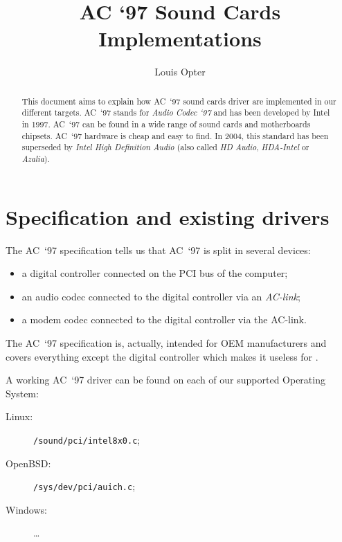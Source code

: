 \documentclass[a4paper,american]{rtxarticle}
\author{Louis Opter}
\title{AC `97 Sound Cards Implementations}
\begin{document}
\maketitle

\begin{abstract}
This document aims to explain how AC~`97 sound cards driver are implemented in
our different targets. AC~`97 stands for \emph{Audio Codec `97} and has been
developed by Intel in 1997. AC~`97 can be found in a wide range of sound cards
and motherboards chipsets. AC~`97 hardware is cheap and easy to find. In 2004,
this standard has been superseded by \emph{Intel High Definition Audio} (also
called \emph{HD Audio}, \emph{HDA-Intel} or \emph{Azalia}).
\end{abstract}

\section{Specification and existing drivers}

The AC~`97 specification tells us\cite[p. 11]{AC97spec} that AC~`97 is split in
several devices:
\begin{itemize}
\item a digital controller connected on the PCI bus of the computer;
\item an audio codec connected to the digital controller via an \emph{AC-link};
\item a modem codec connected to the digital controller via the AC-link.
\end{itemize}
The AC~`97 specification is, actually, intended for OEM manufacturers and covers
everything except the digital controller which makes it useless for \rtx.

A working AC~`97 driver can be found on each of our supported Operating System:
\begin{description}
\item[Linux:] \texttt{/sound/pci/intel8x0.c};
\item[OpenBSD:] \texttt{/sys/dev/pci/auich.c};
\item[Windows:] \ldots
\end{description}

\newpage

\rtxmaketitleblock

\rtxbibliography
\end{document}
